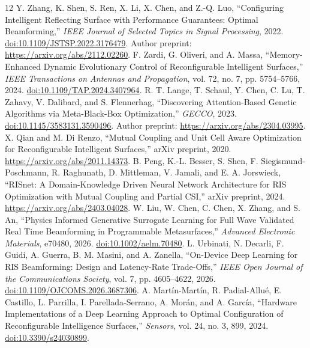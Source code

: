 \begin{thebibliography}{12}
 Y. Zhang, K. Shen, S. Ren, X. Li, X. Chen, and Z.-Q. Luo, ``Configuring Intelligent Reflecting Surface with Performance Guarantees: Optimal Beamforming,'' \emph{IEEE Journal of Selected Topics in Signal Processing}, 2022. \href{https://doi.org/10.1109/JSTSP.2022.3176479}{doi:10.1109/JSTSP.2022.3176479}. Author preprint: \url{https://arxiv.org/abs/2112.02260}.
 F. Zardi, G. Oliveri, and A. Massa, ``Memory-Enhanced Dynamic Evolutionary Control of Reconfigurable Intelligent Surfaces,'' \emph{IEEE Transactions on Antennas and Propagation}, vol. 72, no. 7, pp. 5754--5766, 2024. \href{https://doi.org/10.1109/TAP.2024.3407964}{doi:10.1109/TAP.2024.3407964}.
 R. T. Lange, T. Schaul, Y. Chen, C. Lu, T. Zahavy, V. Dalibard, and S. Flennerhag, ``Discovering Attention-Based Genetic Algorithms via Meta-Black-Box Optimization,'' \emph{GECCO}, 2023. \href{https://doi.org/10.1145/3583131.3590496}{doi:10.1145/3583131.3590496}. Author preprint: \url{https://arxiv.org/abs/2304.03995}.
 X. Qian and M. Di Renzo, ``Mutual Coupling and Unit Cell Aware Optimization for Reconfigurable Intelligent Surfaces,'' arXiv preprint, 2020. \url{https://arxiv.org/abs/2011.14373}.
 B. Peng, K.-L. Besser, S. Shen, F. Siegismund-Poschmann, R. Raghunath, D. Mittleman, V. Jamali, and E. A. Jorswieck, ``RISnet: A Domain-Knowledge Driven Neural Network Architecture for RIS Optimization with Mutual Coupling and Partial CSI,'' arXiv preprint, 2024. \url{https://arxiv.org/abs/2403.04028}.
 W. Liu, W. Chen, C. Chen, X. Zhang, and S. An, ``Physics Informed Generative Surrogate Learning for Full Wave Validated Real Time Beamforming in Programmable Metasurfaces,'' \emph{Advanced Electronic Materials}, e70480, 2026. \href{https://doi.org/10.1002/aelm.70480}{doi:10.1002/aelm.70480}.
 L. Urbinati, N. Decarli, F. Guidi, A. Guerra, B. M. Masini, and A. Zanella, ``On-Device Deep Learning for RIS Beamforming: Design and Latency-Rate Trade-Offs,'' \emph{IEEE Open Journal of the Communications Society}, vol. 7, pp. 4605--4622, 2026. \href{https://doi.org/10.1109/OJCOMS.2026.3687306}{doi:10.1109/OJCOMS.2026.3687306}.
 A. Mart\'in-Mart\'in, R. Padial-Allu\'e, E. Castillo, L. Parrilla, I. Parellada-Serrano, A. Mor\'an, and A. Garc\'ia, ``Hardware Implementations of a Deep Learning Approach to Optimal Configuration of Reconfigurable Intelligence Surfaces,'' \emph{Sensors}, vol. 24, no. 3, 899, 2024. \href{https://doi.org/10.3390/s24030899}{doi:10.3390/s24030899}.

\end{thebibliography}
